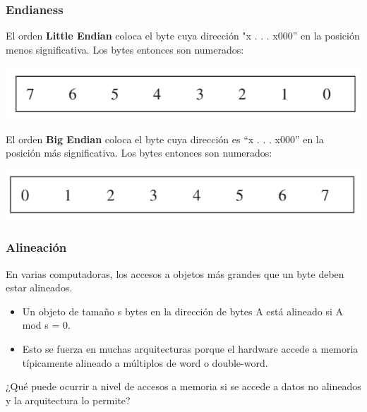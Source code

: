 \documentclass{beamer}
\begin{document}
\begin{frame}
 \frametitle{Endianess}

El orden \textbf{Little Endian} coloca el byte cuya dirección "x . . . x000” en la posición menos significativa. Los bytes entonces son numerados:

  \begin{center}
 \includegraphics[scale=.7,keepaspectratio=true]{little_endian.png}
\end{center}


El orden \textbf{Big Endian} coloca el byte cuya dirección es “x . . . x000”  en la posición más significativa. Los bytes entonces son numerados:

\begin{center}
 \includegraphics[scale=.7,keepaspectratio=true]{big_endian.png}
\end{center}

 \end{frame}


\begin{frame}
 \frametitle{Alineación}
 En varias computadoras, los accesos a objetos más grandes que un byte deben estar alineados.
 \begin{itemize}
  \item Un objeto de tamaño s bytes en la dirección de bytes A está alineado si
    A mod s = 0.
  \item Esto se fuerza en muchas arquitecturas porque el hardware accede a
    memoria típicamente alineado a múltiplos de word o double-word.
 \end{itemize}
\bigskip
 ¿Qué puede ocurrir a nivel de accesos a memoria si se accede a datos no alineados y la arquitectura lo permite?
    
\end{frame}
\end{document}

